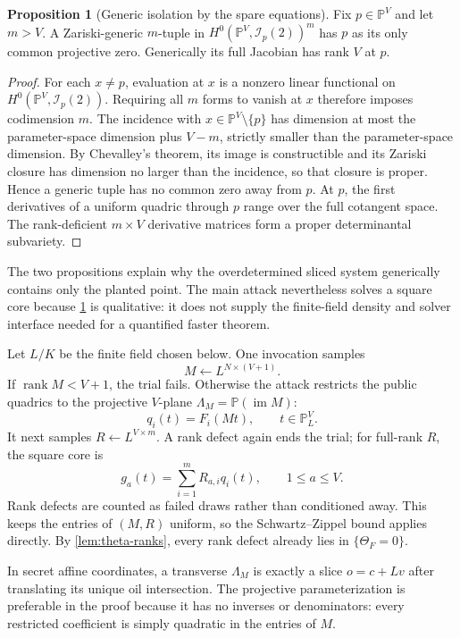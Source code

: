 \documentclass[11pt,a4paper]{article}
\theoremstyle{definition}
\newtheorem{proposition}[theorem]{Proposition}
\theoremstyle{remark}
\newcommand{\PP}{\mathbb P}
\newcommand{\rank}{\operatorname{rank}}
\begin{document}
\begin{proposition}[Generic isolation by the spare equations]\label{prop:generic-full-isolation}
Fix $p\in\PP^V$ and let $m>V$.  A Zariski-generic $m$-tuple in $H^0(\PP^V,\mathcal I_p(2))^m$ has $p$ as its only common projective zero.  Generically its full Jacobian has rank $V$ at $p$.
\end{proposition}

\begin{proof}
For each $x\ne p$, evaluation at $x$ is a nonzero linear functional on $H^0(\PP^V,\mathcal I_p(2))$.  Requiring all $m$ forms to vanish at $x$ therefore imposes codimension $m$.  The incidence with $x\in\PP^V\setminus\{p\}$ has dimension at most the parameter-space dimension plus $V-m$, strictly smaller than the parameter-space dimension.  By Chevalley's theorem, its image is constructible and its Zariski closure has dimension no larger than the incidence, so that closure is proper.  Hence a generic tuple has no common zero away from $p$.  At $p$, the first derivatives of a uniform quadric through $p$ range over the full cotangent space.  The rank-deficient $m\times V$ derivative matrices form a proper determinantal subvariety.
\end{proof}

The two propositions explain why the overdetermined sliced system generically contains only the planted point.  The main attack nevertheless solves a square core because \cref{prop:generic-full-isolation} is qualitative: it does not supply the finite-field density and solver interface needed for a quantified faster theorem.

Let $L/K$ be the finite field chosen below.  One invocation samples
\[
M\leftarrow L^{N\times(V+1)}.
\]
If $\rank M<V+1$, the trial fails.  Otherwise the attack restricts the public quadrics to the projective $V$-plane $\Lambda_M=\PP(\operatorname{im}M)$:
\[
q_i(t)=F_i(Mt),\qquad t\in\PP^V_L.
\]
It next samples $R\leftarrow L^{V\times m}$.  A rank defect again ends the trial; for full-rank $R$, the square core is
\[
g_a(t)=\sum_{i=1}^m R_{a,i}q_i(t),\qquad 1\le a\le V.
\]
Rank defects are counted as failed draws rather than conditioned away.  This keeps the entries of $(M,R)$ uniform, so the Schwartz--Zippel bound applies directly.  By \cref{lem:theta-ranks}, every rank defect already lies in $\{\Theta_F=0\}$.

In secret affine coordinates, a transverse $\Lambda_M$ is exactly a slice $o=c+Lv$ after translating its unique oil intersection.  The projective parameterization is preferable in the proof because it has no inverses or denominators: every restricted coefficient is simply quadratic in the entries of $M$.
\end{document}
